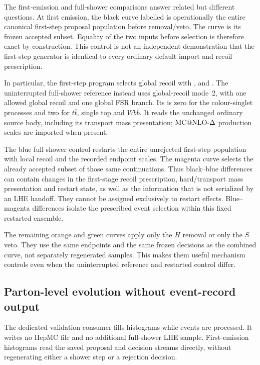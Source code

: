 The first-emission and full-shower comparisons answer related but
different questions.  At first emission, the black curve labelled
\mcatnlo{} is operationally the entire canonical first-step proposal
population before removal/veto.  The \macnlops{} curve is its frozen
accepted subset.  Equality of the two inputs before selection is
therefore exact by construction.  This control is not an independent
demonstration that the first-step generator is identical to every
ordinary default \pythia{} import and recoil prescription.

In particular, the first-step program selects global recoil with
,
 and
.  The uninterrupted full-shower
reference instead uses global-recoil mode~2, with one allowed global
recoil and one global FSR branch.  Its
 is zero for the colour-singlet
processes and two for \(t\bar t\), single top and \(Wb\bar b\).
It reads the unchanged ordinary source body, including its transport
mass presentation; \(\text{MC@NLO-}\Delta\) production scales are imported when
present.

The blue full-shower control restarts the entire unrejected first-step
population with local recoil and the recorded endpoint scales.  The
magenta curve selects the already accepted \macnlops{} subset of
those same continuations.  Thus black--blue differences can contain
changes in the first-stage recoil prescription, hard/transport mass
presentation and restart state, as well as the information that is
not serialized by an LHE handoff.  They cannot be assigned exclusively
to restart effects.  Blue--magenta differences isolate the prescribed
event selection within this fixed restarted ensemble.

The remaining orange and green curves apply only the \(H\) removal
or only the \(S\) veto.  They use the same endpoints and the same
frozen decisions as the combined curve, not separately regenerated
samples.  This makes them useful mechanism controls even when the
uninterrupted reference and restarted control differ.

\subsection{Parton-level evolution without event-record output}
\label{sec:impl-streaming}

The dedicated validation consumer
 fills
histograms while events are processed.  It writes no HepMC file and
no additional full-shower LHE sample.  First-emission histograms read
the saved proposal and decision streams directly, without regenerating
either a shower step or a rejection decision.

